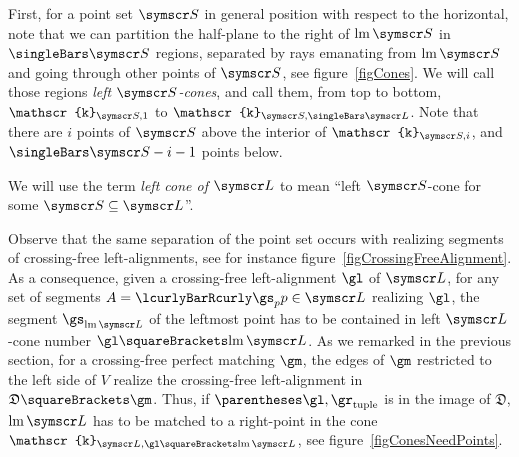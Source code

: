 \documentclass[10pt, a4paper, twoside]{basestyle}
\DeclareMathOperator{\leftmost}{lm}
\newcommand{\pointset}{\symscr}
\newcommand{\lcone}[1]{\mathscr{k}_{\pointset L, #1}}
\newcommand{\scone}[1]{\mathscr{k}_{\pointset S, #1}}
\newcommand{\decomposition}{\mathfrak{D}}
\begin{document}
First, for a point set $\pointset S$ in general position with respect to the horizontal,
note that we can partition the half-plane to the right of $\leftmost\pointset S$ in
$\Cardinality{\pointset S}$ regions,
separated by rays emanating from $\leftmost\pointset S$ and going through other points of
$\pointset S$, see figure~\ref{figCones}.
We will call those regions \emph{left $\pointset S$-cones}, and call them, from top to bottom, $\scone 1$ to
$\scone {\Cardinality{\pointset L}}$.
Note that there are $i$ points of $\pointset S$ above the interior of $\scone i$,
and $\Cardinality {\pointset S} - i - 1$ points below.

We will use the term \emph{left cone of $\pointset L$} to mean
``left $\pointset S$-cone for some $\pointset S\Subset\pointset L$''.

Observe that the same separation of the point set occurs with realizing segments of crossing-free left-alignments,
see for instance figure~\ref{figCrossingFreeAlignment}.
As a consequence, given a crossing-free left-alignment
$\gl$ of $\pointset L$, for any set of segments $A=\setst{\gs_p}{p\in\pointset L}$
realizing $\gl$, the segment $\gs_{\leftmost\pointset L}$ of the leftmost point has to be contained in left
$\pointset L$-cone number $\gl\of{\leftmost\pointset L}$.
As we remarked in the previous section, for a crossing-free perfect matching $\gm$, the edges of $\gm$ restricted
to the left side of $V$ realize the crossing-free
left-alignment in $\decomposition\of\gm$. Thus, if $\tuple{\gl, \gr}$ is in the image of
$\decomposition$, $\leftmost\pointset L$ has to be matched to a right-point in the cone
$\lcone{\gl\of{\leftmost\pointset L}}$, see figure~\ref{figConesNeedPoints}.
\end{document}
